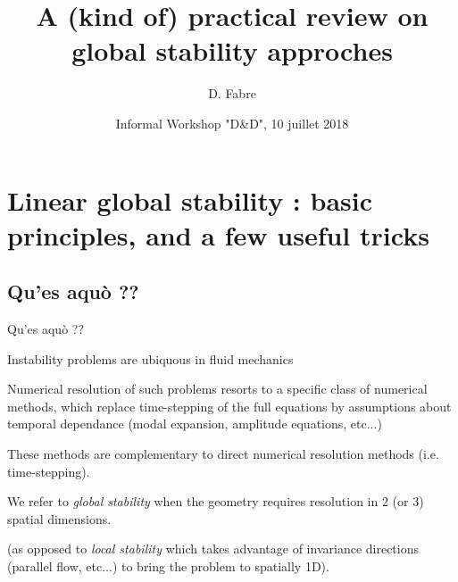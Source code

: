 \documentclass{beamer}
\title{A (kind of) practical review on global stability approches}
\subtitle{}
\author{D. Fabre}
\institute{IMFT, groupe InterfaceS}
\date{Informal Workshop "D\&D", 10 juillet 2018}
\newcommand{\ssp}{\vspace{.2cm} }
\begin{document}
\begin{frame}

\titlepage

\end{frame}

\section{Linear global stability  : basic principles, and a few useful tricks}

\subsection{Qu'es aquò ??}

\begin{frame}{Qu'es aquò ?? } 


Instability problems are ubiquous in fluid mechanics

\ssp

Numerical resolution of such problems resorts to a specific class of numerical methods, which replace
time-stepping of the full equations by  assumptions about temporal dependance (modal expansion, amplitude equations, etc...)
 
 \ssp These methods are complementary to direct numerical resolution methods (i.e. time-stepping).


\ssp

We refer to {\em global stability} when the geometry requires resolution in 2 (or 3) spatial dimensions.



\ssp

(as opposed to {\em local stability } which takes advantage of invariance directions (parallel flow, etc...)
to bring the problem to spatially 1D).
 



\end{frame}



\end{document}
